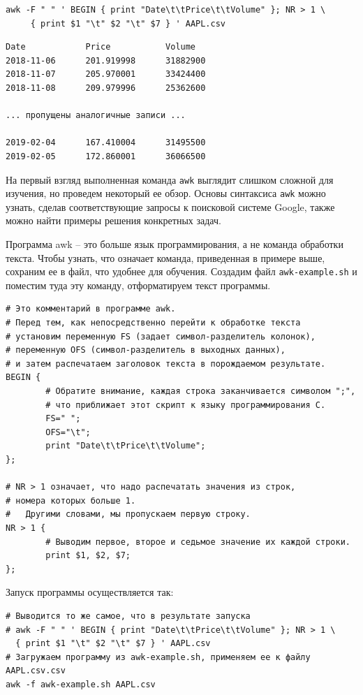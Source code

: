 \documentclass[12pt]{article}
\begin{document}
\begin{verbatim}
awk -F " " ' BEGIN { print "Date\t\tPrice\t\tVolume" }; NR > 1 \
     { print $1 "\t" $2 "\t" $7 } ' AAPL.csv
\end{verbatim}

\begin{verbatim}
Date            Price           Volume
2018-11-06      201.919998      31882900
2018-11-07      205.970001      33424400
2018-11-08      209.979996      25362600

... пропущены аналогичные записи ...

2019-02-04      167.410004      31495500
2019-02-05      172.860001      36066500
\end{verbatim}

На первый взгляд выполненная команда \texttt{awk} выглядит слишком сложной для изучения, но
проведем некоторый ее обзор. Основы синтаксиса \texttt{awk} можно узнать, сделав
соответствующие запросы к поисковой системе Google, также можно найти
примеры решения конкретных задач.

Программа awk -- это больше язык программирования, а не команда обработки
текста. Чтобы узнать, что означает команда, приведенная в примере выше, сохраним ее в
файл, что удобнее для обучения. Создадим файл \texttt{awk-example.sh} и
поместим туда эту команду, отформатируем текст программы.

\begin{verbatim}
# Это комментарий в программе awk.
# Перед тем, как непосредственно перейти к обработке текста
# установим переменную FS (задает символ-разделитель колонок),
# переменную OFS (символ-разделитель в выходных данных),
# и затем распечатаем заголовок текста в порождаемом результате.
BEGIN {
        # Обратите внимание, каждая строка заканчивается символом ";",
        # что приближает этот скрипт к языку программирования C.
        FS=" ";
        OFS="\t";
        print "Date\t\tPrice\t\tVolume";
};

# NR > 1 означает, что надо распечатать значения из строк,
# номера которых больше 1.
#   Другими словами, мы пропускаем первую строку.
NR > 1 {
        # Выводим первое, второе и седьмое значение их каждой строки.
        print $1, $2, $7;
};
\end{verbatim}

Запуск программы осуществляется так:

\begin{verbatim}
# Выводится то же самое, что в результате запуска
# awk -F " " ' BEGIN { print "Date\t\tPrice\t\tVolume" }; NR > 1 \
  { print $1 "\t" $2 "\t" $7 } ' AAPL.csv
# Загружаем программу из awk-example.sh, применяем ее к файлу AAPL.csv.csv
awk -f awk-example.sh AAPL.csv
\end{verbatim}
\end{document}
